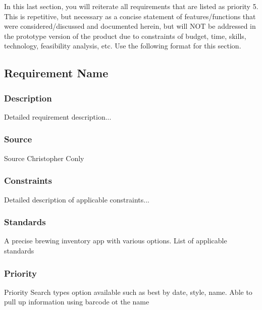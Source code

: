 In this last section, you will reiterate all requirements that are listed as priority 5. This is repetitive, but necessary as a concise statement of features/functions that were considered/discussed and documented herein, but will NOT be addressed in the prototype version of the product due to constraints of budget, time, skills, technology, feasibility analysis, etc. Use the following format for this section.

\subsection{Requirement Name}

\subsubsection{Description}
Detailed requirement description...
\subsubsection{Source}
Source
Christopher Conly
\subsubsection{Constraints}

Detailed description of applicable constraints...
\subsubsection{Standards}
A precise brewing inventory app with various options.
List of applicable standards
\subsubsection{Priority}
Priority
Search types option available such as best by date, style, name.
Able to pull up information using barcode ot the name 
